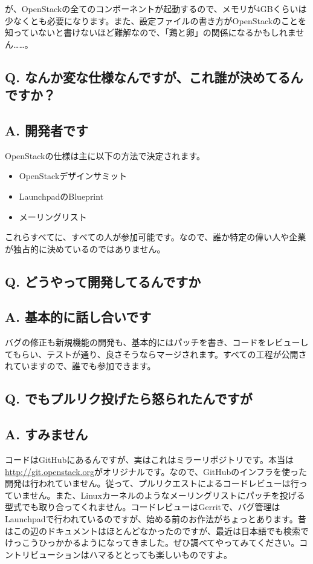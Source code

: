 \documentclass[9pt,b5paper,tombo,openany]{jsbook}
\begin{document}
が、OpenStackの全てのコンポーネントが起動するので、メモリが4GBくらいは少なくとも必要になります。また、設定ファイルの書き方がOpenStackのことを知っていないと書けないほど難解なので、「鶏と卵」の関係になるかもしれません……。

\subsection*{{\bfseries Q.} なんか変な仕様なんですが、これ誰が決めてるんですか？}
\subsection*{{\bfseries A.} 開発者です}
OpenStackの仕様は主に以下の方法で決定されます。
\begin{itemize}
	\item OpenStackデザインサミット
	\item LaunchpadのBlueprint
	\item メーリングリスト
\end{itemize}
これらすべてに、すべての人が参加可能です。なので、誰か特定の偉い人や企業が独占的に決めているのではありません。

\subsection*{{\bfseries Q.} どうやって開発してるんですか}
\subsection*{{\bfseries A.} 基本的に話し合いです}
バグの修正も新規機能の開発も、基本的にはパッチを書き、コードをレビューしてもらい、テストが通り、良さそうならマージされます。すべての工程が公開されていますので、誰でも参加できます。

\subsection*{{\bfseries Q.} でもプルリク投げたら怒られたんですが}
\subsection*{{\bfseries A.} すみません}
コードはGitHubにあるんですが、実はこれはミラーリポジトリです。本当は\url{http://git.openstack.org}がオリジナルです。なので、GitHubのインフラを使った開発は行われていません。従って、プルリクエストによるコードレビューは行っていません。また、Linuxカーネルのようなメーリングリストにパッチを投げる型式でも取り合ってくれません。コードレビューはGerritで、バグ管理はLaunchpadで行われているのですが、始める前のお作法がちょっとあります。昔はこの辺のドキュメントはほとんどなかったのですが、最近は日本語でも検索でけっこうひっかかるようになってきました。ぜひ調べてやってみてください。コントリビューションはハマるととっても楽しいものですよ。
\end{document}
